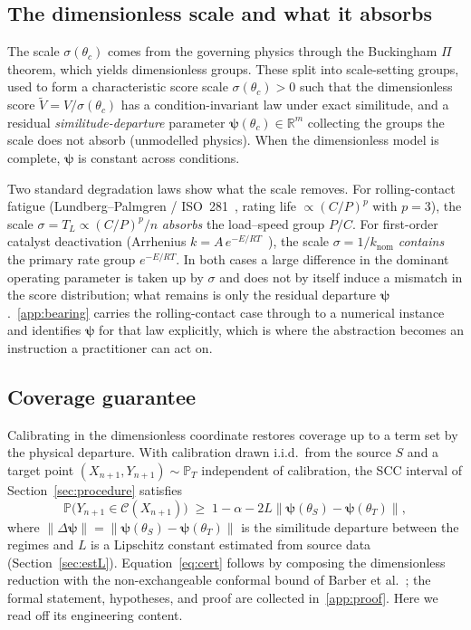 \subsection{The dimensionless scale and what it absorbs}\label{sec:scale}
The scale $\sigma(\theta_c)$ comes from the governing physics through the Buckingham $\Pi$ theorem,
which yields dimensionless groups. These split into scale-setting groups, used to form a
characteristic score scale $\sigma(\theta_c)>0$ such that the dimensionless score
$\tilde V=V/\sigma(\theta_c)$ has a condition-invariant law under exact similitude, and a residual
\emph{similitude-departure} parameter $\boldsymbol\psi(\theta_c)\in\mathbb R^m$ collecting the groups
the scale does not absorb (unmodelled physics). When the dimensionless model is complete,
$\boldsymbol\psi$ is constant across conditions.

Two standard degradation laws show what the scale removes. For rolling-contact fatigue
(Lundberg--Palmgren / ISO~281~\cite{lundberg1947dynamic,iso281}, rating life $\propto(C/P)^p$ with
$p=3$), the scale $\sigma=T_L\propto(C/P)^p/n$ \emph{absorbs} the load--speed group $P/C$. For
first-order catalyst deactivation (Arrhenius $k=A\,e^{-E/RT}$~\cite{levenspiel1999chemical,perry2008handbook}),
the scale $\sigma=1/k_{\mathrm{nom}}$ \emph{contains} the primary rate group $e^{-E/RT}$. In both
cases a large difference in the dominant operating parameter is taken up by $\sigma$ and does not by
itself induce a mismatch in the score distribution; what remains is only the residual departure
$\boldsymbol\psi$.~\ref{app:bearing} carries the rolling-contact case through to a
numerical instance and identifies $\boldsymbol\psi$ for that law explicitly, which is where the abstraction
becomes an instruction a practitioner can act on.

\subsection{Coverage guarantee}\label{sec:guarantee}
Calibrating in the dimensionless coordinate restores coverage up to a term set by the physical
departure. With calibration drawn i.i.d.\ from the source $S$ and a target point
$(X_{n+1},Y_{n+1})\sim\mathbb P_T$ independent of calibration, the SCC interval of
Section~\ref{sec:procedure} satisfies
\begin{equation}\label{eq:cert}
\mathbb P\big(Y_{n+1}\in\mathcal C(X_{n+1})\big)\;\ge\;
1-\alpha-2L\lVert\boldsymbol\psi(\theta_S)-\boldsymbol\psi(\theta_T)\rVert,
\end{equation}
where $\lVert\Delta\boldsymbol\psi\rVert=\lVert\boldsymbol\psi(\theta_S)-\boldsymbol\psi(\theta_T)\rVert$
is the similitude departure between the regimes and $L$ is a Lipschitz constant estimated from source
data (Section~\ref{sec:estL}). Equation~\eqref{eq:cert} follows by composing the dimensionless
reduction with the non-exchangeable conformal bound of Barber et al.~\cite{barber2023conformal}; the
formal statement, hypotheses, and proof are collected in~\ref{app:proof}. Here we read off its
engineering content.

